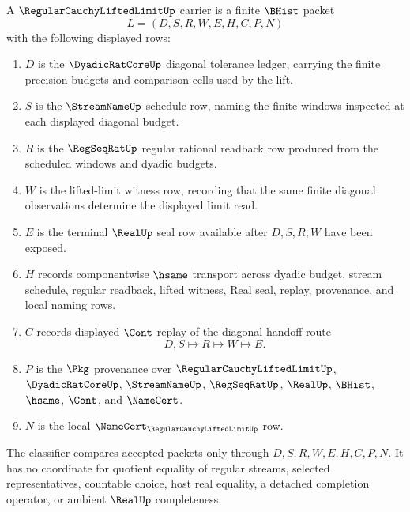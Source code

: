 \begin{definition}
\label{def:regular-cauchy-lifted-limit-carrier}
A $\RegularCauchyLiftedLimitUp$ carrier is a finite $\BHist$ packet
$$
L=(D,S,R,W,E,H,C,P,N)
$$
with the following displayed rows:
\begin{enumerate}
\item $D$ is the $\DyadicRatCoreUp$ diagonal tolerance ledger, carrying the finite precision budgets and comparison cells used by the lift.
\item $S$ is the $\StreamNameUp$ schedule row, naming the finite windows inspected at each displayed diagonal budget.
\item $R$ is the $\RegSeqRatUp$ regular rational readback row produced from the scheduled windows and dyadic budgets.
\item $W$ is the lifted-limit witness row, recording that the same finite diagonal observations determine the displayed limit read.
\item $E$ is the terminal $\RealUp$ seal row available after $D,S,R,W$ have been exposed.
\item $H$ records componentwise $\hsame$ transport across dyadic budget, stream schedule, regular readback, lifted witness, Real seal, replay, provenance, and local naming rows.
\item $C$ records displayed $\Cont$ replay of the diagonal handoff route
$$
D,S \longmapsto R \longmapsto W \longmapsto E .
$$
\item $P$ is the $\Pkg$ provenance over $\RegularCauchyLiftedLimitUp$, $\DyadicRatCoreUp$, $\StreamNameUp$, $\RegSeqRatUp$, $\RealUp$, $\BHist$, $\hsame$, $\Cont$, and $\NameCert$.
\item $N$ is the local $\NameCert_{\RegularCauchyLiftedLimitUp}$ row.
\end{enumerate}
The classifier compares accepted packets only through $D,S,R,W,E,H,C,P,N$. It has no coordinate for quotient equality of regular streams, selected representatives, countable choice, host real equality, a detached completion operator, or ambient $\RealUp$ completeness.
\end{definition}

